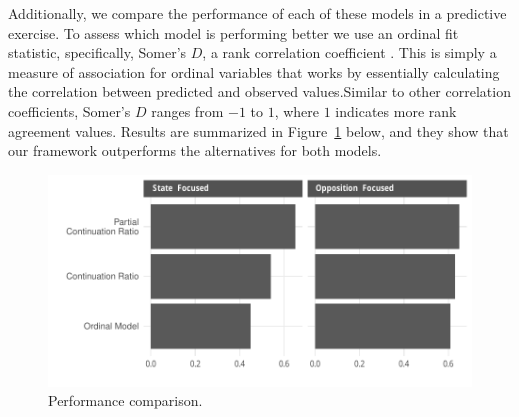 Additionally, we compare the performance of each of these models in a predictive exercise. To assess which model is performing better we use an ordinal fit statistic, specifically, Somer's $D$, a rank correlation coefficient \citep{Somers1962}. This is simply a measure of association for ordinal variables that works by essentially calculating the correlation between predicted and observed values.Similar to other correlation coefficients, Somer's $D$ ranges from $-1$ to $1$, where $1$ indicates more rank agreement values. Results are summarized in Figure~\ref{fig:somersD} below, and they show that our framework outperforms the alternatives for both models.

\begin{figure}
    \centering
    \includegraphics[width=1\textwidth]{somerViz.pdf}
    \caption{Performance comparison.}
    \label{fig:somersD}
\end{figure}



